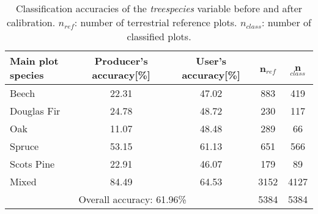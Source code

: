 \begin{table}[H]
	\begin{center}
		\caption{Classification accuracies of the \textit{treespecies} variable before and after calibration. $n_{ref}$: number of terrestrial reference plots. $n_{class}$: number of classified plots.}
		\vspace{0.2cm}
		\label{tab:classacc}
		{\small %
			\begin{tabular}{l|c|c|c|c} %
				\hline
				Main plot species & Producer's accuracy[\%] & User's accuracy[\%] & n$_{ref}$ & n$_{class}$ \\
				\hline \hline	
				Beech       & 22.31 & 47.02 & 883 & 419 \\
				Douglas Fir & 24.78 & 48.72 & 230 & 117 \\
				Oak         & 11.07 & 48.48 & 289 & 66 \\
				Spruce      & 53.15 & 61.13 & 651 & 566 \\
				Scots Pine  & 22.91 & 46.07 & 179 & 89 \\
				Mixed       & 84.49 & 64.53 & 3152 & 4127 \\
				\hlineB{2}
				& \multicolumn{2}{l|}{Overall accuracy: 61.96\%} & 5384 & 5384 \\
				\hline \hline
			\end{tabular}
		}%
	\end{center}
\end{table}

